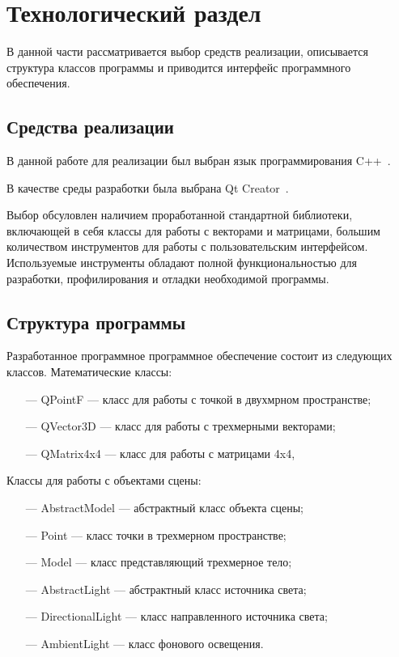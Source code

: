 \chapter{Технологический раздел}
В данной части рассматривается выбор средств реализации, описывается структура классов программы и приводится интерфейс программного обеспечения.

\section{Средства реализации}
В данной работе для реализации был выбран язык программирования C++~\cite{C++}.

В качестве среды разработки была выбрана Qt Creator~\cite{Qt}.

Выбор обсуловлен наличием проработанной стандартной библиотеки, включающей в себя классы для работы с векторами и матрицами, большим количеством инструментов для работы с пользовательским интерфейсом. Используемые инструменты обладают полной функциональностью для разработки, профилирования и отладки необходимой программы.

\section{Структура программы}
Разработанное программное программное обеспечение состоит из следующих классов. Математические классы:
\begin{itemize}
    \item[---] QPointF --- класс для работы с точкой в двухмрном пространстве;
    \item[---] QVector3D --- класс для работы с трехмерными векторами;
    \item[---] QMatrix4x4 --- класс для работы с матрицами 4x4,
\end{itemize}
Классы для работы с объектами сцены:
\begin{itemize}
    \item[---] AbstractModel --- абстрактный класс объекта сцены;
    \item[---] Point --- класс точки в трехмерном пространстве;
    \item[---] Model --- класс представляющий трехмерное тело;
    \item[---] AbstractLight --- абстрактный класс источника света;
    \item[---] DirectionalLight --- класс направленного источника света;
    \item[---] AmbientLight --- класс фонового освещения.
\end{itemize}

